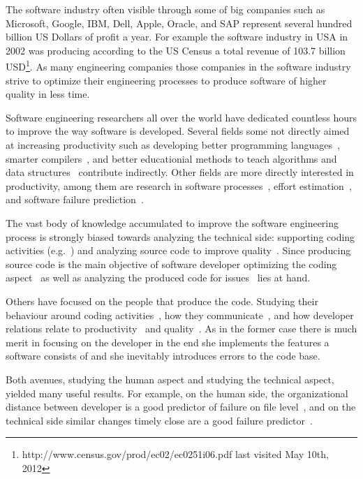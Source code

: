 The software industry often visible through some of big companies such as Microsoft, Google, IBM, Dell, Apple, Oracle, and SAP represent several hundred billion US Dollars of profit a year. 
For example the software industry in USA in 2002 was producing according to the US Census a total revenue of 103.7 billion USD\footnote{http://www.census.gov/prod/ec02/ec0251i06.pdf last visited May 10th, 2012}.
As many engineering companies those companies in the software industry strive to optimize their engineering processes to produce software of higher quality in less time.

Software engineering researchers all over the world have dedicated countless hours to improve the way software is developed.
Several fields some not directly aimed at increasing productivity such as developing better programming languages~\cite{conf:prog:lang}, smarter compilers~\cite{cong:comp:constr}, and better educationial methods to teach algorithms and data structures~\cite{conf:sigcse} contribute indirectly.
Other fields are more directly interested in productivity, among them are research in software processes~\cite{conf:icssp}, effort estimation~\cite{molkken:isese:2003,boehm:analse:2000}, and software failure prediction~\cite{conf:promise}.

The vast body of knowledge accumulated to improve the software engineering process is strongly biased towards analyzing the technical side: supporting coding activities (e.g.~\cite{bassil:iwpc:2001,mens:tse:2004}) and analyzing source code to improve quality~\cite{zimmermann:oopsla:2005,nagappan:icse:2006}. 
Since producing source code is the main objective of software developer optimizing the coding aspect~\cite{bassil:iwpc:2001,mens:tse:2004} as well as analyzing the produced code for issues~\cite{nagappan:icse:2005,schroeter:isese:2006} lies at hand.

Others have focused on the people that produce the code. Studying their behaviour around coding activities~\cite{latoza:icse:2006}, how they communicate~\cite{ko:icse:2007,gopal:2002:comacm}, and how developer relations relate to productivity~\cite{gopal:2002:comacm} and quality~\cite{abreu:iwpse:2009,wolf:icse:2009}.
As in the former case there is much merit in focusing on the developer in the end she implements the features a software consists of and she inevitably introduces errors to the code base.

Both avenues, studying the human aspect and studying the technical aspect, yielded many useful results.
For example, on the human side, the organizational distance between developer is a good predictor of failure on file level~\cite{nagappan:icse:2008}, and on the technical side similar changes timely close are a good failure predictor~\cite{kim:icse:2007}.


